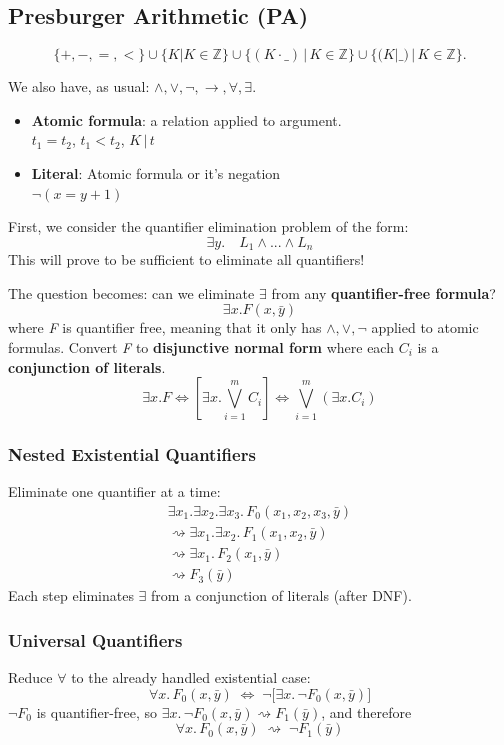 \documentclass[11pt]{article}
\begin{document}
\subsection*{Presburger Arithmetic (PA)}
\[
	\{+, -, =, <\} \cup \{K | K \in \mathbb{Z}\} \cup \{(K \cdot \textbf{\_}) \, | \, K \in \mathbb{Z} \} \cup \{(K | \_ ) \, | \, K \in \mathbb{Z}\}
.\]

We also have, as usual: $\land, \lor, \neg, \to, \forall, \exists$.

\begin{itemize}
	\item \textbf{Atomic formula}: a relation applied to argument. \\
	$t_1 = t_2$, $t_1 < t_2$, $ K \, | \, t$
	\item \textbf{Literal}: Atomic formula or it's negation \\
	$\neg (x = y + 1)$
\end{itemize}

First, we consider the quantifier elimination problem of the form: $$\exists y. \quad L_1 \land ... \land L_n$$ This will prove to be sufficient to eliminate all quantifiers!

The question becomes: can we eliminate $\exists$ from any \textbf{quantifier-free formula}? $$\exists x. F(x, \bar{y})$$ where \textit{F} is quantifier free, meaning that it only has $\land, \lor, \neg$ applied to atomic formulas. Convert \textit{F} to \textbf{disjunctive normal form} where each $C_i$ is a \textbf{conjunction of literals}. $$\exists x. F \Leftrightarrow [\exists x. \bigvee^{m}_{i=1} C_i] \Leftrightarrow \bigvee^{m}_{i=1} (\exists x. C_i) $$

\begin{minipage}[t]{0.46\textwidth}
\subsubsection*{Nested Existential Quantifiers}
Eliminate one quantifier at a time:
\[
\begin{align}
\exists x_1.\exists x_2.\exists x_3.\,F_0(x_1,x_2,x_3,\bar{y}) \\
\rightsquigarrow \exists x_1.\exists x_2.\,F_1(x_1,x_2,\bar{y}) \\
\rightsquigarrow \exists x_1.\,F_2(x_1,\bar{y}) \\
\rightsquigarrow F_3(\bar{y})
\end{align}
\]
Each step eliminates $\exists$ from a conjunction of literals (after DNF).
\end{minipage}\hfill
\vrule
\hfill
\begin{minipage}[t]{0.46\textwidth}
\subsubsection*{Universal Quantifiers}
Reduce $\forall$ to the already handled existential case:
\[
\forall x.\,F_0(x,\bar{y})
\;\Leftrightarrow\;
\neg\big[\exists x.\,\neg F_0(x,\bar{y})\big]
\]
$\neg F_0$ is quantifier-free, so
$\exists x.\,\neg F_0(x,\bar{y}) \rightsquigarrow F_1(\bar{y})$, and therefore
\[
\forall x.\,F_0(x,\bar{y})
\;\rightsquigarrow\;
\neg F_1(\bar{y})
\]
\end{minipage}
\end{document}
